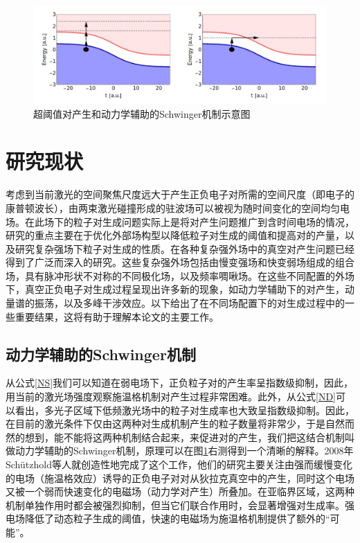 \begin{figure}
  \centering
  \includegraphics[width=0.8\linewidth]{figures/fig/fig1.8.jpg}
  \caption{超阈值对产生和动力学辅助的Schwinger机制示意图}
  \label{tu8}
\end{figure}

\section{研究现状}

考虑到当前激光的空间聚焦尺度远大于产生正负电子对所需的空间尺度（即电子的康普顿波长），由两束激光碰撞形成的驻波场可以被视为随时间变化的空间均匀电场。在此场下的粒子对生成问题实际上是将对产生问题推广到含时间电场的情况，研究的重点主要在于优化外部场构型以降低粒子对生成的阈值和提高对的产量，以及研究复杂强场下粒子对生成的性质。在各种复杂强外场中的真空对产生问题已经得到了广泛而深入的研究。这些复杂强外场包括由慢变强场和快变弱场组成的组合场，具有脉冲形状不对称的不同极化场，以及频率啁啾场。在这些不同配置的外场下，真空正负电子对生成过程呈现出许多新的现象，如动力学辅助下的对产生，动量谱的振荡，以及多峰干涉效应。以下给出了在不同场配置下的对生成过程中的一些重要结果，这将有助于理解本论文的主要工作。

\subsection{动力学辅助的Schwinger机制}

从公式\ref{NS}我们可以知道在弱电场下，正负粒子对的产生率呈指数级抑制，因此，用当前的激光场强度观察施温格机制对产生过程非常困难。此外，从公式\ref{ND}可以看出，多光子区域下低频激光场中的粒子对生成率也大致呈指数级抑制。因此，在目前的激光条件下仅由这两种对生成机制产生的粒子数量将非常少，于是自然而然的想到，能不能将这两种机制结合起来，来促进对的产生，我们把这结合机制叫做动力学辅助的Schwinger机制，原理可以在图\ref{tu8}右测得到一个清晰的解释。2008年Sch{\"u}tzhold等人就创造性地完成了这个工作\cite{2008d}，他们的研究主要关注由强而缓慢变化的电场（施温格效应）诱导的正负电子对对从狄拉克真空中的产生，同时这个电场又被一个弱而快速变化的电磁场（动力学对产生）所叠加。在亚临界区域，这两种机制单独作用时都会被强烈抑制，但当它们联合作用时，会显著增强对生成率。强电场降低了动态粒子生成的阈值，快速的电磁场为施温格机制提供了额外的“可能”。

